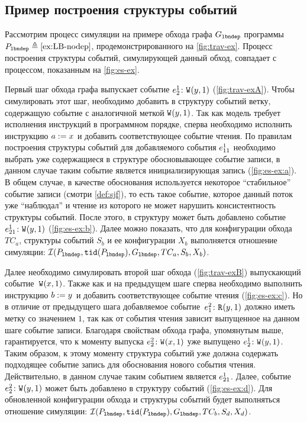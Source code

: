 
\subsection{Пример построения структуры событий}

Рассмотрим процесс симуляции на примере
обхода графа $G_{\mathtt{lbndep}}$ программы $P_{\mathtt{lbndep}} \triangleq \text{\ref{ex:LB-nodep}}$,
продемонстрированного на \cref{fig:trav-ex}.
Процесс построения структуры событий,
симулирующей данный обход, совпадает с процессом,
показанным на \cref{fig:es-ex}.



Первый шаг обхода графа выпускает событие
$e^{1}_{2}\colon {{\mathtt{W}}}^{}({y},{1}){}$ (\cref{fig:trav-exA}).
Чтобы симулировать этот шаг, необходимо добавить
в структуру событий ветку, содержащую событие
с аналогичной меткой ${{\mathtt{W}}}^{}({y},{1}){}$.
Так как модель \Wkm требует исполнения инструкций
в программном порядке, сперва необходимо исполнить  
инструкцию $a \;{:=}\;{x}^{}$ и добавить соответствующее событие чтения.
По правилам построения структуры событий \Wkm
для добавляемого события $e^{1}_{11}$ необходимо
выбрать уже содержащиеся в структуре обосновывающее событие записи,
в данном случае таким событие является
инициализирующая запись (\cref{fig:es-ex:a}).
В общем случае, в качестве обоснования используется
некоторое ``стабильное'' событие записи (смотри \cref{def:sjf}),
то есть такое событие, которое данный поток уже ``наблюдал''
и чтение из которого не может нарушить консистентность структуры событий.
После этого, в структуру может быть добавлено событие
$e^{1}_{21}\colon {{\mathtt{W}}}^{}({y},{1})$ (\cref{fig:es-ex:b}).
Далее можно показать, что для конфигурации обхода $TC_a$,
структуры событий $S_b$ и ее конфигурации $X_b$
выполняется отношение симуляции:
$\mathcal{I}(P_{\mathtt{lbndep}}, {\mathtt{tid}}(P_{\mathtt{lbndep}}), G_{\mathtt{lbndep}}, TC_a, S_b, X_b)$.

Далее необходимо симулировать второй шаг обхода
(\cref{fig:trav-exB}) выпускающий событие~${{\mathtt{W}}}^{}({x},{1})$.
Также как и на предыдущем шаге сперва необходимо
выполнить инструкцию $b \;{:=}\;{y}^{}$ и добавить соответствующее
событие чтения (\cref{fig:es-ex:c}). Но в отличие от предыдущего шага
добавляемое событие~$e^{2}_{1}\colon {{\mathtt{R}}}^{}({y},{1})$ должно иметь
метку со значением $1$, так как от события чтения
зависит выпущенное на данном шаге событие записи.
Благодаря свойствам обхода графа, упомянутым выше,
гарантируется, что к моменту выпуска $e^{2}_{2}\colon {{\mathtt{W}}}^{}({x},{1}){}$
уже выпущено $e^{1}_{2}\colon {{\mathtt{W}}}^{}({y},{1})$.
Таким образом, к этому моменту структура событий уже должна
содержать подходящее событие запись для обоснования нового события чтения.
Действительно, в данном случае таким событием является $e^{1}_{21}$.
Далее, событие $e^{2}_{2}\colon {{\mathtt{W}}}^{}({y},{1}){}$ может быть добавлено
в структуру событий (\cref{fig:es-ex:d}).
Для обновленной конфигурации обхода и структуры событий
будет выполняться отношение симуляции:
$\mathcal{I}(P_{\mathtt{lbndep}}, {\mathtt{tid}}(P_{\mathtt{lbndep}}), G_{\mathtt{lbndep}}, TC_b, S_d, X_d)$.

